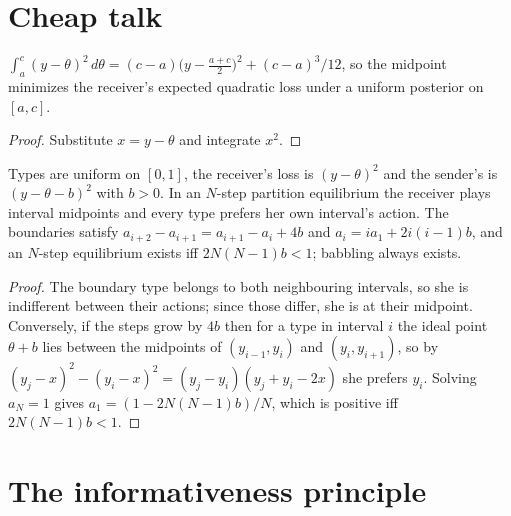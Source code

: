 \section{Cheap talk}
\label{sec:cheap-talk}

\begin{lemma}
\label{lem:midpoint}
\leanok
$\int_a^c (y-\theta)^2\,d\theta = (c-a)\bigl(y - \tfrac{a+c}{2}\bigr)^2 + (c-a)^3/12$, so the midpoint minimizes the
receiver's expected quadratic loss under a uniform posterior on $[a,c]$.
\end{lemma}
\begin{proof}
\leanok
Substitute $x = y - \theta$ and integrate $x^2$.
\end{proof}

\begin{theorem}
\label{thm:crawford-sobel}
\leanok
{}
Types are uniform on $[0,1]$, the receiver's loss is $(y-\theta)^2$ and the sender's is $(y-\theta-b)^2$ with
$b > 0$. In an $N$-step partition equilibrium the receiver plays interval midpoints and every type prefers her own
interval's action. The boundaries satisfy $a_{i+2} - a_{i+1} = a_{i+1} - a_i + 4b$ and
$a_i = i a_1 + 2i(i-1)b$, and an $N$-step equilibrium exists iff $2N(N-1)b < 1$; babbling always exists.
\end{theorem}
\begin{proof}
\leanok
The boundary type belongs to both neighbouring intervals, so she is indifferent between their actions; since
those differ, she is at their midpoint. Conversely, if the steps grow by $4b$ then for a type in interval $i$
the ideal point $\theta + b$ lies between the midpoints of $(y_{i-1}, y_i)$ and $(y_i, y_{i+1})$, so by
$(y_j - x)^2 - (y_i - x)^2 = (y_j - y_i)(y_j + y_i - 2x)$ she prefers $y_i$. Solving $a_N = 1$ gives
$a_1 = (1 - 2N(N-1)b)/N$, which is positive iff $2N(N-1)b < 1$.
\end{proof}


\section{The informativeness principle}
\label{sec:informativeness}

